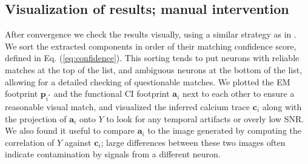 \documentclass[10pt,letterpaper]{article}
\begin{document}
{%


\subsection{Visualization of results; manual intervention}

After convergence we check the results visually, using a similar strategy as in \citep{Pnevmatikakis2016, Zhou2018}.  We sort the extracted components in order of their matching confidence score, defined in Eq. (\ref{eq:confidence}). This sorting tends to put neurons with reliable matches at the top of the list, and ambiguous neurons at the bottom of the list, allowing for a detailed checking of questionable matches. 
We plotted the EM footprint $\bm{p}_{i^*}$ and the functional CI footprint $\bm{a}_i$ next to each other to ensure a reasonable visual match, and visualized the inferred calcium trace $\bm{c}_i$ along with the projection of $\bm{a}_i$ onto $Y$ to look for any temporal artifacts or overly low SNR.  We also found it useful to compare $\bm{a}_i$ to the image generated by computing the correlation of $Y$ against $\bm{c}_i$; large differences between these two images often indicate contamination by signals from a different neuron. 



}
\end{document}
